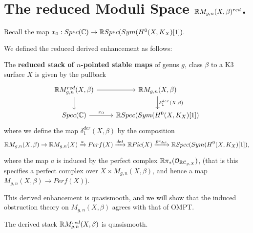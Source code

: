 \section{The reduced Moduli Space $\mathbb R M_{g,n}(X,\beta)^{red}$.}
\label{sec:reduced moduli space}

Recall the map $x_{0}:Spec(\mathbb C)\rightarrow  \mathbb R Spec(Sym(H^{0}(X,K_{X})[1])$.

We defined the reduced derived enhancement as follows:
\begin{defin}
The \textbf{reduced stack of $n$-pointed stable maps} of genus $g$, class $\beta$ to a K3 surface $X$ is given by the pullback
\[
\begin{tikzcd}
\R M_{g,n}^{red}(X,\beta)\arrow{r}\arrow{d} & \R M_{g,n}(X,\beta)\arrow{d}{\delta_{1}^{der}(X,\beta)} \\
Spec(\C)\arrow{r}{x_{0}} & \R Spec(Sym(H^{0}(X,K_{X})[1])
\end{tikzcd}
\]
where we define the map $\delta_{1}^{der}(X,\beta)$ by the composition
\[\mathbb R M_{g,n}(X,\beta)\rightarrow \mathbb R M_{g,n}(X)\xrightarrow{a} Perf(X)\xrightarrow{det} \mathbb R Pic(X)\xrightarrow{pr_{det}} \mathbb R Spec(Sym(H^{0}(X,K_{X})[1]),\]

where the map $a$ is induced by the perfect complex $\mathbb R \pi_{*}(\mathcal{O}_{\mathbb R \mathcal{C}_{g,X}})$, (that is this specifies a perfect complex over $X\times M_{g,n}(X,\beta)$, and hence a map  $M_{g,n}(X,\beta)\rightarrow Perf(X)$).
\end{defin}

\begin{rem}
This derived enhancement is quasismooth, and we will show that the induced obstruction theory on $M_{g,n}(X,\beta)$ agrees with that of OMPT.
\end{rem}

\begin{prop}
The derived stack $\mathbb R M_{g,n}^{red}(X,\beta)$ is quasismooth.
\end{prop}


